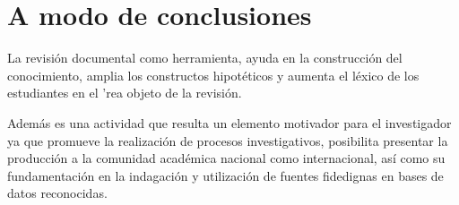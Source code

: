 \setchapterpreamble[u]{\margintoc}

\chapter{A modo de conclusiones}
\label{ch:ejercicios}

La revisión documental como herramienta,
ayuda en la construcción del conocimiento,
amplia los constructos hipotéticos y  aumenta  el l\'exico de los
estudiantes en el  \a'rea objeto de la revisi\'on.

Adem\'as es una actividad  que resulta  un
elemento motivador para el investigador ya que promueve  la
realización de procesos investigativos, posibilita presentar la producción  a la comunidad académica nacional como internacional, así
como su fundamentación en la indagación y
utilización de fuentes fidedignas en bases de datos reconocidas.